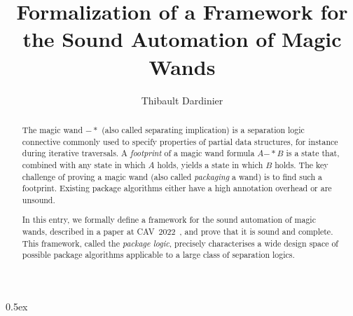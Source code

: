 \documentclass[11pt,a4paper]{article}
\newcommand{\wand}{\ensuremath{\mathbin{-\!\!*}}}
\begin{document}
\title{Formalization of a Framework for the Sound Automation of Magic Wands}
\author{Thibault Dardinier}
\maketitle

\begin{abstract}
The magic wand $\wand$ (also called separating implication) is a separation logic~\cite{Reynolds02a} connective
commonly used to specify properties of partial data structures,
for instance during iterative traversals.
A \emph{footprint} of a magic wand formula $A \wand B$ is a state that, combined with any state in which $A$ holds, yields a state in which $B$ holds.
The key challenge of proving a magic wand (also called \emph{packaging} a wand) is to find such a footprint.
Existing package algorithms either have a high annotation overhead or are unsound.

In this entry, we formally define a framework for the sound automation of magic wands, described in a paper at CAV~2022~\cite{Dardinier22},
and prove that it is sound and complete.
This framework, called the \emph{package logic}, precisely characterises a wide design space of possible package algorithms applicable to a large class of separation logics.
\end{abstract}

\tableofcontents

\parindent 0pt\parskip 0.5ex





\end{document}
